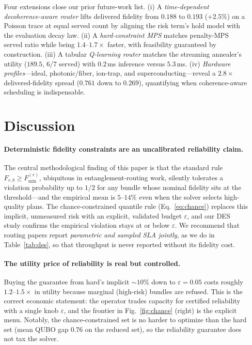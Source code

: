 \documentclass[twocolumn]{article}
\begin{document}
Four extensions close our prior future-work list.
(i) A \emph{time-dependent decoherence-aware router} lifts delivered
fidelity from $0.188$ to $0.193$ ($+2.5\%$) on a Poisson trace at
equal served count by aligning the risk term's hold model with the
evaluation decay law.  (ii) A \emph{hard-constraint MPS} matches
penalty-MPS served ratio while being $1.4$--$1.7\times$ faster, with
feasibility guaranteed by construction.  (iii) A tabular
\emph{Q-learning router} matches the streaming annealer's utility
($189.5$, 6/7 served) with $0.2\,$ms inference versus $5.3\,$ms.
(iv) \emph{Hardware profiles}---ideal, photonic/fiber, ion-trap, and
superconducting---reveal a $2.8\times$ delivered-fidelity spread
($0.761$ down to $0.269$), quantifying when coherence-aware scheduling
is indispensable.

\section{Discussion}
\label{sec:discussion}

\paragraph{Deterministic fidelity constraints are an uncalibrated
reliability claim.}  The central methodological finding of this paper
is that the standard rule $F_{r,b} \ge F_{\min}^{(r)}$, ubiquitous in
entanglement-routing work, silently tolerates a violation probability
up to $1/2$ for any bundle whose nominal fidelity sits at the
threshold---and the empirical mean is $5$--$14\%$ even when the solver
selects high-quality plans.  The chance-constrained quantile rule
(Eq.~\eqref{eq:chance}) replaces this implicit, unmeasured risk with
an explicit, validated budget $\varepsilon$, and our DES study
confirms the empirical violation stays at or below $\varepsilon$.  We
recommend that routing papers report \emph{parametric and sampled
SLA jointly}, as we do in Table~\ref{tab:des}, so that throughput is
never reported without its fidelity cost.

\paragraph{The utility price of reliability is real but
controlled.}  Buying the guarantee from hard's implicit $\sim\!10\%$
down to $\varepsilon=0.05$ costs roughly $1.2$--$1.5\times$ in utility
because marginal (high-risk) bundles are refused.  This is the correct
economic statement: the operator trades capacity for certified
reliability with a single knob $\varepsilon$, and the frontier in
Fig.~\ref{fig:chance} (right) is the explicit menu.  Notably, the
chance-constrained set is no harder to optimize than the hard set
(mean QUBO gap $0.76$ on the reduced set), so the reliability
guarantee does not tax the solver.
\end{document}
